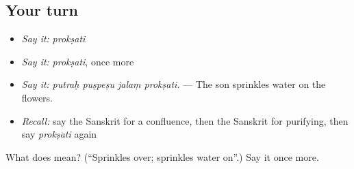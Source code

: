 \subsection*{Your turn}
\begin{itemize}
\raggedright
  \item \emph{Say it:} \emph{prokṣati}
  \item \emph{Say it:} \emph{prokṣati}, once more
  \item \emph{Say it:} \emph{putraḥ puṣpeṣu jalaṃ prokṣati.} — The son sprinkles water on the flowers.
  \item \emph{Recall:} say the Sanskrit for a confluence, then the Sanskrit for purifying, then say \emph{prokṣati} again
\end{itemize}

\begin{tcolorbox}[breakable,colback=teal!4,colframe=teal!35!black,title={Before you move on}]
What does  mean? (\textquotedblleft{}Sprinkles over; sprinkles water on\textquotedblright{}.) Say it once more.
\end{tcolorbox}
